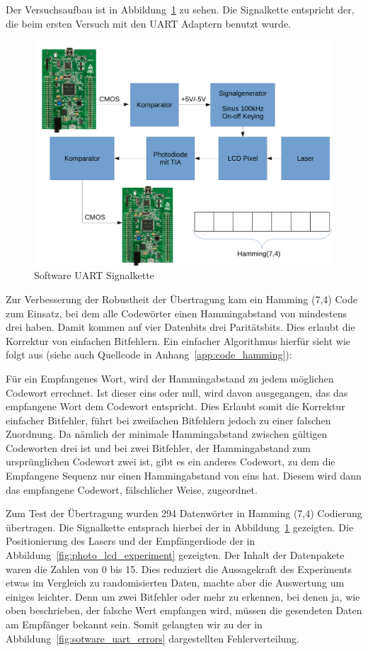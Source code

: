 \documentclass[12pt,a4paper]{article}
\begin{document}
Der Versuchsaufbau ist in Abbildung~\ref{fig:sotware_uart_signal_chain} zu sehen. Die Signalkette entspricht der, die beim ersten Versuch mit den UART Adaptern benutzt wurde.

\begin{figure}[H]
  \centering
  \includegraphics[width=\textwidth]{img/software_uart.pdf}
  \caption{Software UART Signalkette}
  \label{fig:sotware_uart_signal_chain}
\end{figure}

Zur Verbesserung der Robustheit der Übertragung kam ein Hamming (7,4) Code zum Einsatz, bei dem alle Codewörter einen Hammingabstand von mindestens drei haben. Damit kommen auf vier Datenbits drei Paritätsbits. Dies erlaubt die Korrektur von einfachen Bitfehlern. Ein einfacher Algorithmus hierfür sieht wie folgt aus (siehe auch Quellcode in Anhang~\ref{app:code_hamming}):

Für ein Empfangenes Wort, wird der Hammingabstand zu jedem möglichen Codewort errechnet. Ist dieser eins oder null, wird davon ausgegangen, das das empfangene Wort dem Codewort entspricht. Dies Erlaubt somit die Korrektur einfacher Bitfehler, führt bei zweifachen Bitfehlern jedoch zu einer falschen Zuordnung. Da nämlich der minimale Hammingabstand zwischen gültigen Codeworten drei ist und bei zwei Bitfehler, der Hammingabstand zum ursprünglichen Codewort zwei ist, gibt es ein anderes Codewort, zu dem die Empfangene Sequenz nur einen Hammingabstand von eins hat. Diesem wird dann das empfangene Codewort, fälschlicher Weise, zugeordnet.

Zum Test der Übertragung wurden 294 Datenwörter in Hamming (7,4) Codierung übertragen. Die Signalkette entsprach hierbei der in Abbildung~\ref{fig:sotware_uart_signal_chain} gezeigten. Die Positionierung des Lasers und der Empfängerdiode der in Abbildung~\ref{fig:photo_lcd_experiment} gezeigten. Der Inhalt der Datenpakete waren die Zahlen von 0 bis 15. Dies reduziert die Aussagekraft des Experiments etwas im Vergleich zu randomisierten Daten, machte aber die Auswertung um einiges leichter. Denn um zwei Bitfehler oder mehr zu erkennen, bei denen ja, wie oben beschrieben, der falsche Wert empfangen wird, müssen die gesendeten Daten am Empfänger bekannt sein. Somit gelangten wir zu der in Abbildung~\ref{fig:sotware_uart_errors} dargestellten Fehlerverteilung.
\end{document}
